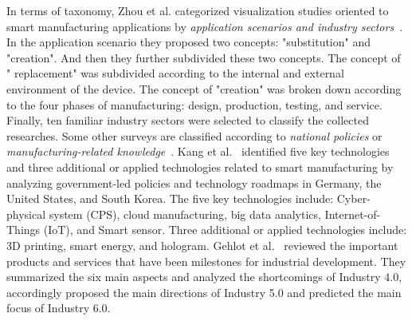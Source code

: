 \documentclass[a4paper,fleqn]{cas-dc}
\begin{document}
In terms of taxonomy, Zhou et al. categorized visualization studies oriented to smart manufacturing applications by \textit{application scenarios and industry sectors}~\cite{Zhou2019}.
In the application scenario they proposed two concepts: "substitution" and "creation". And then they further subdivided these two concepts. The concept of " replacement" was subdivided according to the internal and external environment of the device. The concept of "creation" was broken down according to the four phases of manufacturing: design, production, testing, and service. Finally, ten familiar industry sectors were selected to classify the collected researches.
Some other surveys are classified according to \textit{national policies} or \textit{manufacturing-related knowledge}~\cite{Kang2016,Gehlot2022}.
Kang et al.~\cite{Kang2016} identified five key technologies and three additional or applied technologies related to smart manufacturing by analyzing government-led policies and technology roadmaps in Germany, the United States, and South Korea. The five key technologies include: Cyber-physical system (CPS), cloud manufacturing, big data analytics, Internet-of-Things (IoT), and Smart sensor. Three additional or applied technologies include: 3D printing, smart energy, and hologram.
Gehlot et al.~\cite{Gehlot2022} reviewed the important products and services that have been milestones for industrial development. They summarized the six main aspects and analyzed the shortcomings of Industry 4.0, accordingly proposed the main directions of Industry 5.0 and predicted the main focus of Industry 6.0.
\end{document}
